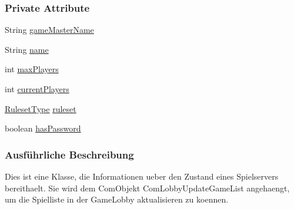 \subsubsection*{Private Attribute}
\begin{DoxyCompactItemize}
\item 
\hypertarget{a00073_ad3f74f58e5b41a74c02e21e0407280b8}{String \hyperlink{a00073_ad3f74f58e5b41a74c02e21e0407280b8}{game\-Master\-Name}}\label{a00073_ad3f74f58e5b41a74c02e21e0407280b8}

\item 
\hypertarget{a00073_a9a2326f35466e54c36c070829245c557}{String \hyperlink{a00073_a9a2326f35466e54c36c070829245c557}{name}}\label{a00073_a9a2326f35466e54c36c070829245c557}

\item 
\hypertarget{a00073_aa1b24fe78bd4f1d94890fc632e97151f}{int \hyperlink{a00073_aa1b24fe78bd4f1d94890fc632e97151f}{max\-Players}}\label{a00073_aa1b24fe78bd4f1d94890fc632e97151f}

\item 
\hypertarget{a00073_a2ea963db2aa2189f682df32952d4df12}{int \hyperlink{a00073_a2ea963db2aa2189f682df32952d4df12}{current\-Players}}\label{a00073_a2ea963db2aa2189f682df32952d4df12}

\item 
\hypertarget{a00073_ab1a0de7ba523f1538143a3924bc5db91}{\hyperlink{a00066}{Ruleset\-Type} \hyperlink{a00073_ab1a0de7ba523f1538143a3924bc5db91}{ruleset}}\label{a00073_ab1a0de7ba523f1538143a3924bc5db91}

\item 
\hypertarget{a00073_aeb207819150d367d4c5b73beaec78e52}{boolean \hyperlink{a00073_aeb207819150d367d4c5b73beaec78e52}{has\-Password}}\label{a00073_aeb207819150d367d4c5b73beaec78e52}

\end{DoxyCompactItemize}


\subsubsection{Ausführliche Beschreibung}
Dies ist eine Klasse, die Informationen ueber den Zustand eines Spielservers bereithaelt. Sie wird dem Com\-Objekt Com\-Lobby\-Update\-Game\-List angehaengt, um die Spielliste in der Game\-Lobby aktualisieren zu koennen. 

